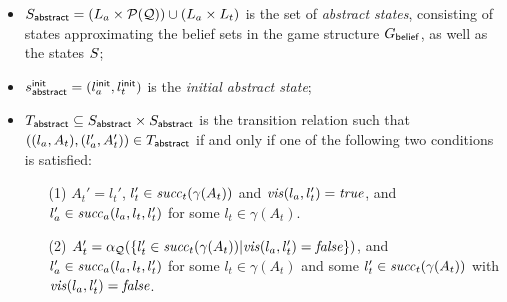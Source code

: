 \begin{itemize}
\item $S_{\mathsf{abstract}} = (L_a \times \mathcal P(\mathcal{Q})) \cup (L_a \times L_t)$  is the set of \emph{abstract states}, consisting of states approximating the belief sets in the game structure $G_{\mathsf{belief}}$, as well as the states $S$;
\item $s^{\mathsf{init}}_{\mathsf{abstract}} = (l_a^{\mathsf{init}},l_t^{\mathsf{init}})$ is the \emph{initial abstract state};
\item $T_{\mathsf{abstract}} \subseteq S_{\mathsf{abstract}} \times S_{\mathsf{abstract}}$ is the transition relation such that $((l_a, A_t),(l_a', A_t')) \in T_{\mathsf{abstract}}$ if and only if one of the following two conditions is satisfied:
\begin{itemize}
\item[(1)] $A_t' = l_t'$, $l_t' \in \mathit{succ}_t(\gamma(A_t))$ and $\mathit{vis}(l_a,l_t') = \mathit{true}$, and
$l_a' \in \mathit{succ}_a(l_a,l_t,l_t')$ for some $l_t \in \gamma(A_t)$.
\item[(2)] $A_t' = \alpha_{\mathcal{Q}}(\{l_t' \in \mathit{succ}_t(\gamma(A_t))  |  \mathit{vis}(l_a,l_t') = \mathit{false}\})$, and
$l_a' \in \mathit{succ}_a(l_a,l_t,l_t')$ for some $l_t \in \gamma(A_t)$ and some
$l_t' \in \mathit{succ}_t(\gamma(A_t))$ with $\mathit{vis}(l_a,l_t') = \mathit{false}$.


\end{itemize}
\end{itemize}

